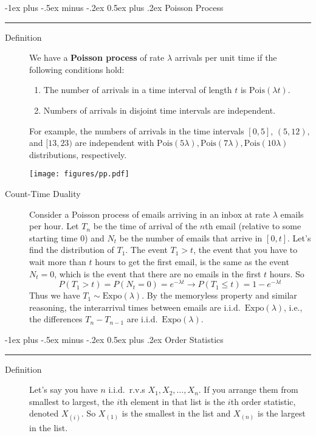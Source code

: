 \documentclass[10pt,landscape]{article}
\makeatletter
\newcommand{\Expo}{\textrm{Expo}}
\newcommand{\Pois}{\textrm{Pois}}
\renewcommand{\section}{\@startsection{section}{1}{0mm}%
                                {-1ex plus -.5ex minus -.2ex}%
                                {0.5ex plus .2ex}%
                                {\normalfont\large\bfseries}}
\makeatother
\begin{document}
\begin{multicols*}{3}
\section{Poisson Process}\smallskip \hrule height 2pt \smallskip

\begin{description}
\item[Definition] We have a \textbf{Poisson process} of rate $\lambda$ arrivals per unit time if the following conditions hold:
\begin{enumerate}
    \item The number of arrivals in a time interval of length $t$ is $\Pois(\lambda t)$.
    \item Numbers of arrivals in disjoint time intervals are independent.
\end{enumerate}
For example, the numbers of arrivals in the time intervals $[0,5]$, $(5,12),$ and $[13,23)$ are independent with $\Pois(5\lambda), \Pois(7\lambda), \Pois(10\lambda)$ distributions, respectively.
\begin{minipage}{\linewidth}
            \centering
\texttt{[image: figures/pp.pdf]}
        \end{minipage}
       
\item[Count-Time Duality]  Consider a Poisson process of emails arriving in an inbox at rate $\lambda$ emails per hour. Let $T_n$ be the time of arrival of the $n$th email (relative to some starting time $0$) and $N_t$ be the number of emails that arrive in $[0,t]$. Let's find the distribution of $T_1$. The event $T_1 > t$, the event that you have to wait more than $t$ hours to get the first email, is the same as the event $N_t = 0$, which is the event that there are no emails in the first $t$ hours. So
\[P(T_1 > t) = P(N_t = 0) = e^{-\lambda t} \longrightarrow P(T_1 \leq t) = 1 - e^{-\lambda t}\]
Thus we have $T_1 \sim \Expo(\lambda)$. By the memoryless property and similar reasoning, the interarrival times between emails are i.i.d.~$\Expo(\lambda)$, i.e., the differences $T_n - T_{n-1}$ are i.i.d.~$\Expo(\lambda)$.
\end{description}

\section{Order Statistics}\smallskip \hrule height 2pt \smallskip
\begin{description}
    \item[Definition] Let's say you have $n$ i.i.d.~r.v.s $X_1, X_2,\dots, X_n$. If you arrange them from smallest to largest, the $i$th element in that list is the $i$th order statistic, denoted $X_{(i)}$. So $X_{(1)}$ is the smallest in the list and $X_{(n)}$ is the largest in the list. \smallskip
    

\end{description}
\end{multicols*}
\end{document}
